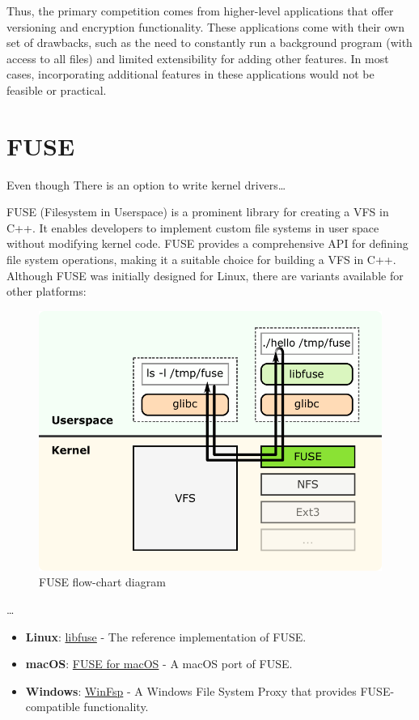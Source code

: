 Thus, the primary competition comes from higher-level applications that offer versioning and encryption functionality.
These applications come with their own set of drawbacks, such as the need to constantly run a background program (with access to all files) and limited extensibility for adding other features.
In most cases, incorporating additional features in these applications would not be feasible or practical.

\section{FUSE}\label{sec:fuse-analysis}

Even though There is an option to write kernel drivers\ldots

FUSE (Filesystem in Userspace) is a prominent library for creating a VFS in C++.
It enables developers to implement custom file systems in user space without modifying kernel code.
FUSE provides a comprehensive API for defining file system operations, making it a suitable choice for building a VFS in C++.
Although FUSE was initially designed for Linux, there are variants available for other platforms:

\begin{figure}[ht]
    \centering
    \includegraphics[width=\linewidth]{img/fuse_diagram}
    \caption{FUSE flow-chart diagram}
    \label{fig:fuse-diagram}
\end{figure}

\ldots

\begin{itemize}
\item \textbf{Linux}: \href{https://github.com/libfuse/libfuse}{libfuse} - The reference implementation of FUSE\@.
\item \textbf{macOS}: \href{https://osxfuse.github.io/}{FUSE for macOS} - A macOS port of FUSE\@.
\item \textbf{Windows}: \href{https://github.com/billziss-gh/winfsp}{WinFsp} - A Windows File System Proxy that provides FUSE-compatible functionality.
\end{itemize}

